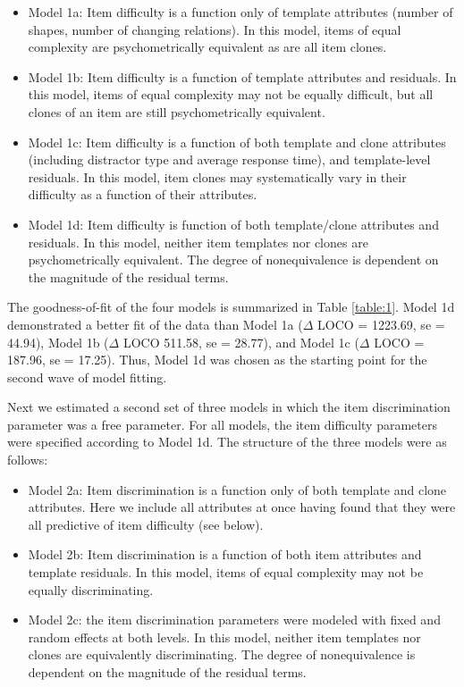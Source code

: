 \documentclass[a4paper,man,natbib]{apa6}
\begin{document}
\begin{itemize}

\item Model 1a: Item difficulty is a function only of template attributes (number of shapes, number of changing relations). In this model, items of equal complexity are psychometrically equivalent as are all item clones.

\item Model 1b: Item difficulty is a function of template attributes and residuals. In this model, items of equal complexity may not be equally difficult, but all clones of an item are still psychometrically equivalent.

\item Model 1c: Item difficulty is a function of both template and clone attributes (including distractor type and average response time), and template-level residuals. In this model, item clones may systematically vary in their difficulty as a function of their attributes.  

\item Model 1d: Item difficulty is function of both template/clone attributes and residuals. In this model, neither item templates nor clones are psychometrically equivalent. The degree of nonequivalence is dependent on the magnitude of the residual terms.

\end{itemize}

The goodness-of-fit of the four models is summarized in Table \ref{table:1}. Model 1d demonstrated a better fit of the data than Model 1a ($\Delta$ LOCO = 1223.69, se = 44.94), Model 1b ($\Delta$ LOCO 511.58, se = 28.77), and Model 1c ($\Delta$ LOCO = 187.96, se = 17.25). Thus, Model 1d was chosen as the starting point for the second wave of model fitting.

Next we estimated a second set of three models in which the item discrimination parameter was a free parameter. For all models, the item difficulty parameters were specified according to Model 1d. The structure of the three models were as follows:

\begin{itemize}

    \item Model 2a: Item discrimination is a function only of both template and clone attributes. Here we include all attributes at once having found that they were all predictive of item difficulty (see below). 
    
    \item Model 2b: Item discrimination is a function of both item attributes and template residuals. In this model, items of equal complexity may not be equally discriminating.
    
    \item Model 2c: the item discrimination parameters were modeled with fixed and random effects at both levels. In this model, neither item templates nor clones are equivalently discriminating. The degree of nonequivalence is dependent on the magnitude of the residual terms. 
    
\end{itemize}
\end{document}
